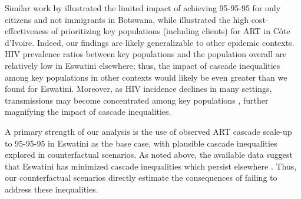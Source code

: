 Similar work by \citet{Marukutira2020} illustrated the limited impact of
achieving 95-95-95 for only citizens and not immigrants in Botswana,
while \citet{Maheu-Giroux2019cost} illustrated the high cost-effectiveness of
prioritizing key populations (including clients) for ART in C\^{o}te d’Ivoire.
Indeed, our findings are likely generalizable to other epidemic contexts.
HIV prevalence ratios between key populations and the population overall
are relatively low in Eswatini \vs elsewhere;
thus, the impact of cascade inequalities among key populations in other contexts
would likely be even greater than we found for Eswatini.
Moreover, as HIV incidence declines in many settings,
transmissions may become concentrated among key populations \cite{Brown2019},
further magnifying the impact of cascade inequalities.
\par
A primary strength of our analysis is the use of
observed ART cascade scale-up to 95-95-95 in Eswatini as the base case,
with plausible cascade inequalities explored in counterfactual scenarios.
As noted above, the available data suggest that Eswatini has
minimized cascade inequalities which persist elsewhere \cite{Hakim2018}.
Thus, our counterfactual scenarios directly estimate
the consequences of failing to address these inequalities.
